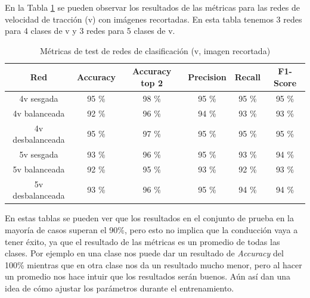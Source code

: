 En la Tabla \ref{metricas_classificacion_recortada_v} se pueden observar los resultados de las métricas para las redes de velocidad de tracción (v) con imágenes recortadas. En esta tabla tenemos 3 redes para 4 clases de v y 3 redes para 5 clases de v.\\

\begin{table}[H]
\centering
\caption{Métricas de test de redes de clasificación (v, imagen recortada)}
\label{metricas_classificacion_recortada_v}
\begin{tabular}{c|c|c|c|c|c|}
\cline{1-6}
                        \multicolumn{1}{|c|}{Red}    & Accuracy       & Accuracy top 2      & Precision       & Recall        & F1-Score        \\ \hline
\multicolumn{1}{|c|}{4v sesgada}    & 95 \%     & 98 \%         & 95 \%            & 95 \%          & 95 \%       \\ \hline
\multicolumn{1}{|c|}{4v balanceada}     & 92 \%        & 96 \%          &  94 \%              &  93 \%            &  93 \%             \\ \hline
\multicolumn{1}{|c|}{4v desbalanceada}      &  95 \%        & 97 \%           &  95 \%            & 95 \%        &  95 \%            \\ \hline
\multicolumn{1}{|c|}{5v sesgada}       & 93 \%         & 96 \%     & 95 \%            & 93 \%           & 94 \%              \\ \hline
\multicolumn{1}{|c|}{5v balanceada}      & 92 \%        & 95 \%         & 93 \%           & 92 \%     & 93 \%            \\ \hline
\multicolumn{1}{|c|}{5v desbalanceada}       & 93 \%          & 96 \%           & 95 \%          & 94 \%        & 94 \%               \\ \hline
\end{tabular}
\end{table}


En estas tablas se pueden ver que los resultados en el conjunto de prueba en la mayoría de casos superan el 90\%, pero esto no implica que la conducción vaya a tener éxito, ya que el resultado de las métricas es un promedio de todas las clases. Por ejemplo en una clase nos puede dar un resultado de \textit{Accuracy} del 100\% mientras que en otra clase nos da un resultado mucho menor, pero al hacer un promedio nos hace intuir que los resultados serán buenos. Aún así dan una idea de cómo ajustar los parámetros durante el entrenamiento.\\

